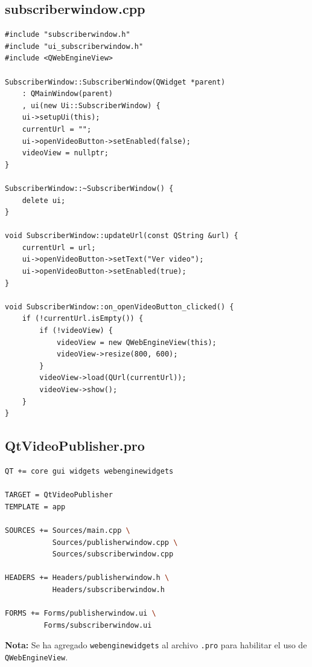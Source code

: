\documentclass[12pt]{article}
\begin{document}
\subsection*{subscriberwindow.cpp}
\begin{lstlisting}
#include "subscriberwindow.h"
#include "ui_subscriberwindow.h"
#include <QWebEngineView>

SubscriberWindow::SubscriberWindow(QWidget *parent)
    : QMainWindow(parent)
    , ui(new Ui::SubscriberWindow) {
    ui->setupUi(this);
    currentUrl = "";
    ui->openVideoButton->setEnabled(false);
    videoView = nullptr;
}

SubscriberWindow::~SubscriberWindow() {
    delete ui;
}

void SubscriberWindow::updateUrl(const QString &url) {
    currentUrl = url;
    ui->openVideoButton->setText("Ver video");
    ui->openVideoButton->setEnabled(true);
}

void SubscriberWindow::on_openVideoButton_clicked() {
    if (!currentUrl.isEmpty()) {
        if (!videoView) {
            videoView = new QWebEngineView(this);
            videoView->resize(800, 600);
        }
        videoView->load(QUrl(currentUrl));
        videoView->show();
    }
}
\end{lstlisting}

\subsection*{QtVideoPublisher.pro}
\begin{lstlisting}[language=bash]
QT += core gui widgets webenginewidgets

TARGET = QtVideoPublisher
TEMPLATE = app

SOURCES += Sources/main.cpp \
           Sources/publisherwindow.cpp \
           Sources/subscriberwindow.cpp

HEADERS += Headers/publisherwindow.h \
           Headers/subscriberwindow.h

FORMS += Forms/publisherwindow.ui \
         Forms/subscriberwindow.ui
\end{lstlisting}

\noindent
\textbf{Nota:} Se ha agregado \texttt{webenginewidgets} al archivo \texttt{.pro} para habilitar el uso de \texttt{QWebEngineView}.
\end{document}
